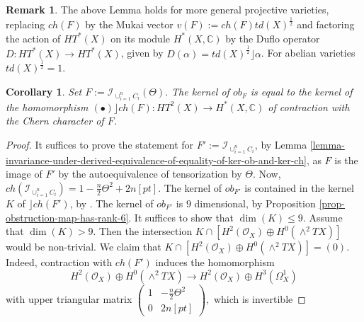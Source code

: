 \documentclass[12pt]{amsart}
\newcommand{\hide}[1]{}
\numberwithin{equation}{subsection}
\theoremstyle{plain}
\newtheorem{cor}[thm]{Corollary}
\theoremstyle{definition}
\newtheorem{rem}[thm]{Remark}
\newcommand{\CC}{{\mathbb C}}
\newcommand{\RightArrowOf}[1]{\stackrel{#1}{\rightarrow}}
\newcommand{\StructureSheaf}[1]{{\mathcal O}_{#1}}
\newcommand{\Ideal}[1]{{\mathcal I}_{#1}}
\newcommand{\Contract}{\rfloor}
\begin{document}
\begin{rem}
The above Lemma holds for more general projective varieties, replacing $ch(F)$ by the Mukai vector $v(F):=ch(F)td(X)^{\frac{1}{2}}$ and factoring the action of $HT^*(X)$ on its module $H^*(X,\CC)$ by the Duflo operator $D:HT^*(X)\rightarrow HT^*(X)$, given by $D(\alpha)=td(X)^{\frac{1}{2}}\Contract\alpha$. For abelian varieties $td(X)^{\frac{1}{2}}=1.$
\end{rem}

\begin{cor}
\label{cor-kernel-of-obstruction-is-annihilator-of-ch} Set $F:=\Ideal{\cup_{i=1}^n C_i}(\Theta).$
The kernel of $ob_F$ is equal to the kernel of the homomorphism $(\bullet)\Contract ch(F):HT^2(X)\rightarrow H^*(X,\CC)$ of contraction with the Chern character of $F$.
\end{cor}

\begin{proof}
\hide{
The $9$-dimensional kernel of $ob_F$ is contained in the kernel $K$ of $\Contract ch(F)$, by \cite[Theorem B]{Huang}. 
It suffices to show that $\dim(K)\leq 9$. 
Assume that $\dim(K)> 9$. Then the intersection
$K\cap [H^2(\StructureSheaf{X})\oplus H^0(\wedge^2TX)]$  would be non-trivial. 
We claim that $K\cap [H^2(\StructureSheaf{X})\oplus H^0(\wedge^2TX)]=(0).$
Indeed, $ch(F)=1+\Theta-\frac{d}{2}\Theta^2-d[pt]$ and the composition of $\Contract ch(F)$ with the projection onto the two summands in the Hodge decomposition
\[
HT^2(X)\RightArrowOf{\Contract ch(F)} H^*(X,\CC)\rightarrow H^{3,1}(X)\oplus H^{1,3}(X)
\]
maps $H^2(\StructureSheaf{X}$ isomorphically into 
}
It suffices to prove the statement for $F':=\Ideal{\cup_{i=1}^n C_i}$, by Lemma \ref{lemma-invariance-under-derived-equivalence-of-equality-of-ker-ob-and-ker-ch}, as $F$ is the image of $F'$ by the autoequivalence of tensorization by $\Theta$. Now, $ch(\Ideal{\cup_{i=1}^n C_i})=1-\frac{n}{2}\Theta^2+2n[pt]$. The kernel of $ob_{F'}$ is contained in the kernel $K$ of $\Contract ch(F')$, by \cite[Theorem B]{Huang}. 
The kernel of $ob_{F'}$ is $9$ dimensional, by Proposition \ref{prop-obstruction-map-has-rank-6}.
It suffices to show that $\dim(K)\leq 9$. Assume that $\dim(K)> 9$. Then the intersection
$K\cap [H^2(\StructureSheaf{X})\oplus H^0(\wedge^2TX)]$  would be non-trivial. 
We claim that $K\cap [H^2(\StructureSheaf{X})\oplus H^0(\wedge^2TX)]=(0).$
Indeed, contraction with $ch(F')$ induces the homomorphism
\[
H^2(\StructureSheaf{X})\oplus H^0(\wedge^2TX)\rightarrow H^2(\StructureSheaf{X})\oplus H^3(\Omega^1_X)
\]
with upper triangular matrix $\left(
\begin{array}{cc}
1 & -\frac{n}{2}\Theta^2
\\
0 & 2n[pt]
\end{array}
\right),$ which is invertible
\end{proof}
\end{document}
